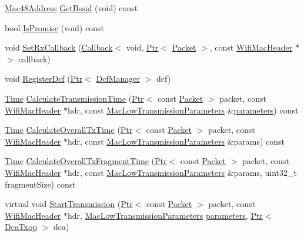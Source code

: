 \begin{DoxyCompactItemize}
\item 
\hyperlink{classns3_1_1Mac48Address}{Mac48\+Address} \hyperlink{classns3_1_1MacLow_a4d11b37c976a0bac9d123fcc4b1fb9e6}{Get\+Bssid} (void) const 
\item 
bool \hyperlink{classns3_1_1MacLow_ad26bc9cc267fbdc079792efdbc6b7c10}{Is\+Promisc} (void) const 
\item 
void \hyperlink{classns3_1_1MacLow_abc6afc705f9a59bd53ebc08bd8afd90f}{Set\+Rx\+Callback} (\hyperlink{classns3_1_1Callback}{Callback}$<$ void, \hyperlink{classns3_1_1Ptr}{Ptr}$<$ \hyperlink{classns3_1_1Packet}{Packet} $>$, const \hyperlink{classns3_1_1WifiMacHeader}{Wifi\+Mac\+Header} $\ast$ $>$ callback)
\item 
void \hyperlink{classns3_1_1MacLow_af68ad85663b5dac711213b900bc0bdb2}{Register\+Dcf} (\hyperlink{classns3_1_1Ptr}{Ptr}$<$ \hyperlink{classns3_1_1DcfManager}{Dcf\+Manager} $>$ dcf)
\item 
\hyperlink{classns3_1_1Time}{Time} \hyperlink{classns3_1_1MacLow_a7773963a988ffddaa862246e1798b2d1}{Calculate\+Transmission\+Time} (\hyperlink{classns3_1_1Ptr}{Ptr}$<$ const \hyperlink{classns3_1_1Packet}{Packet} $>$ packet, const \hyperlink{classns3_1_1WifiMacHeader}{Wifi\+Mac\+Header} $\ast$hdr, const \hyperlink{classns3_1_1MacLowTransmissionParameters}{Mac\+Low\+Transmission\+Parameters} \&\hyperlink{design_8txt_a61257d1df1c87e8bd4ba94cacb4982cf}{parameters}) const 
\item 
\hyperlink{classns3_1_1Time}{Time} \hyperlink{classns3_1_1MacLow_a8fa9fc428371d4fc899d114d67a6f895}{Calculate\+Overall\+Tx\+Time} (\hyperlink{classns3_1_1Ptr}{Ptr}$<$ const \hyperlink{classns3_1_1Packet}{Packet} $>$ packet, const \hyperlink{classns3_1_1WifiMacHeader}{Wifi\+Mac\+Header} $\ast$hdr, const \hyperlink{classns3_1_1MacLowTransmissionParameters}{Mac\+Low\+Transmission\+Parameters} \&params) const 
\item 
\hyperlink{classns3_1_1Time}{Time} \hyperlink{classns3_1_1MacLow_a9d374976855269a4ee89e2369afff3d0}{Calculate\+Overall\+Tx\+Fragment\+Time} (\hyperlink{classns3_1_1Ptr}{Ptr}$<$ const \hyperlink{classns3_1_1Packet}{Packet} $>$ packet, const \hyperlink{classns3_1_1WifiMacHeader}{Wifi\+Mac\+Header} $\ast$hdr, const \hyperlink{classns3_1_1MacLowTransmissionParameters}{Mac\+Low\+Transmission\+Parameters} \&params, uint32\+\_\+t fragment\+Size) const 
\item 
virtual void \hyperlink{classns3_1_1MacLow_a3d13643c758e213041f8389c1041074b}{Start\+Transmission} (\hyperlink{classns3_1_1Ptr}{Ptr}$<$ const \hyperlink{classns3_1_1Packet}{Packet} $>$ packet, const \hyperlink{classns3_1_1WifiMacHeader}{Wifi\+Mac\+Header} $\ast$hdr, \hyperlink{classns3_1_1MacLowTransmissionParameters}{Mac\+Low\+Transmission\+Parameters} \hyperlink{design_8txt_a61257d1df1c87e8bd4ba94cacb4982cf}{parameters}, \hyperlink{classns3_1_1Ptr}{Ptr}$<$ \hyperlink{classns3_1_1DcaTxop}{Dca\+Txop} $>$ dca)

\end{DoxyCompactItemize}
